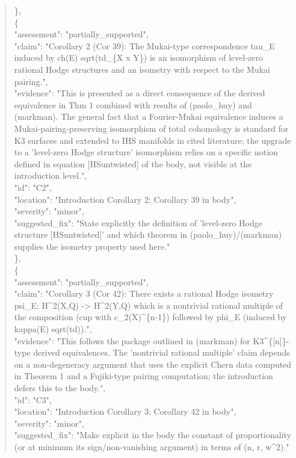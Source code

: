\documentclass[11pt]{article}
\begin{document}
\begin{quote}
    \},\\
    \{\\
      "assessment": "partially\_supported",\\
      "claim": "Corollary 2 (Cor 39): The Mukai-type correspondence tau\_E induced by ch(E) sqrt(td\_\{X x Y\}) is an isomorphism of level-zero rational Hodge structures and an isometry with respect to the Mukai pairing.",\\
      "evidence": "This is presented as a direct consequence of the derived equivalence in Thm 1 combined with results of (paolo\_huy) and (markman). The general fact that a Fourier-Mukai equivalence induces a Mukai-pairing-preserving isomorphism of total cohomology is standard for K3 surfaces and extended to IHS manifolds in cited literature; the upgrade to a 'level-zero Hodge structure' isomorphism relies on a specific notion defined in equation [HSuntwisted] of the body, not visible at the introduction level.",\\
      "id": "C2",\\
      "location": "Introduction Corollary 2; Corollary 39 in body",\\
      "severity": "minor",\\
      "suggested\_fix": "State explicitly the definition of 'level-zero Hodge structure [HSuntwisted]' and which theorem in (paolo\_huy)/(markman) supplies the isometry property used here."\\
    \},\\
    \{\\
      "assessment": "partially\_supported",\\
      "claim": "Corollary 3 (Cor 42): There exists a rational Hodge isometry psi\_E: H\^{}2(X,Q) -> H\^{}2(Y,Q) which is a nontrivial rational multiple of the composition (cup with c\_2(X)\^{}\{n-1\}) followed by phi\_E (induced by kappa(E) sqrt(td)).",\\
      "evidence": "This follows the package outlined in (markman) for K3\^{}\{[n]\}-type derived equivalences. The 'nontrivial rational multiple' claim depends on a non-degeneracy argument that uses the explicit Chern data computed in Theorem 1 and a Fujiki-type pairing computation; the introduction defers this to the body.",\\
      "id": "C3",\\
      "location": "Introduction Corollary 3; Corollary 42 in body",\\
      "severity": "minor",\\
      "suggested\_fix": "Make explicit in the body the constant of proportionality (or at minimum its sign/non-vanishing argument) in terms of (n, r, w\^{}2)."\\

\end{quote}
\end{document}
